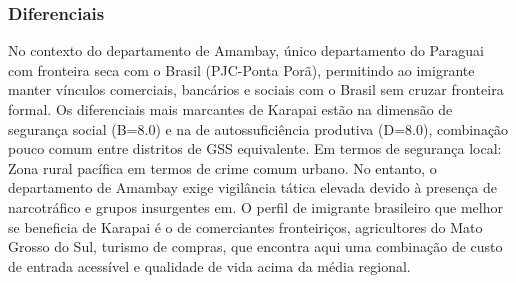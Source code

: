 \subsubsection*{Diferenciais}\label{dif-karapai-1305}
No contexto do departamento de Amambay, único departamento do Paraguai com fronteira seca com o Brasil (PJC-Ponta Porã), permitindo ao imigrante manter vínculos comerciais, bancários e sociais com o Brasil sem cruzar fronteira formal. Os diferenciais mais marcantes de Karapai estão na dimensão de segurança social (B=8.0) e na de autossuficiência produtiva (D=8.0), combinação pouco comum entre distritos de GSS equivalente. Em termos de segurança local: Zona rural pacífica em termos de crime comum urbano. No entanto, o departamento de Amambay exige vigilância tática elevada devido à presença de narcotráfico e grupos insurgentes em. O perfil de imigrante brasileiro que melhor se beneficia de Karapai é o de comerciantes fronteiriços, agricultores do Mato Grosso do Sul, turismo de compras, que encontra aqui uma combinação de custo de entrada acessível e qualidade de vida acima da média regional.

